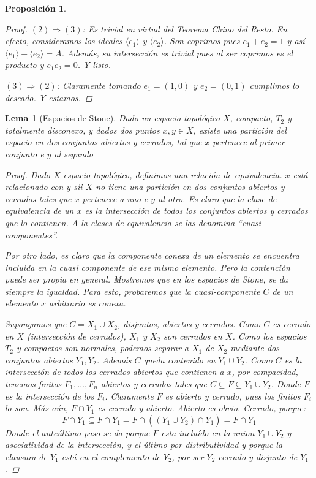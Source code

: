 \documentclass[11pt,a4paper, spanish,oneside,fleqn]{article}
\newtheorem{lem}[teo]{Lema}
\newtheorem{prop}[teo]{Proposición}
\theoremstyle{definition}
\begin{document}
\begin{prop}
\begin{proof}
$(2)\Longrightarrow (3)$: Es trivial en virtud del Teorema Chino del Resto. En efecto, consideramos los ideales $\langle e_1\rangle$ y $\langle e_2\rangle$. Son coprimos pues $e_1 + e_2=1$ y así $\langle e_1\rangle + \langle e_2\rangle = A$. Además, su intersección es trivial pues al ser coprimos es el producto y $e_1e_2=0$. Y listo.

$(3)\Longrightarrow (2)$: Claramente tomando $e_1= (1,0)$ y $e_2=(0,1)$ cumplimos lo deseado. Y estamos.
\end{proof}
\end{prop}


\begin{lem}[Espacios de Stone]
Dado un espacio topol\'ogico $X$, compacto, $T_2$ y totalmente disconexo, y dados
dos puntos $x,y \in X$, existe una partici\'on del espacio en dos
conjuntos abiertos y cerrados, tal que $x$ pertenece al primer conjunto
e $y$ al segundo
\begin{proof}
Dado $X$ espacio topol\'ogico, definimos una relaci\'on de equivalencia. $x$ est\'a
relacionado con $y$ sii $X$ no tiene una partici\'on en dos conjuntos abiertos y
cerrados tales que $x$ pertenece a uno e $y$ al otro. Es claro que la clase de
equivalencia de un $x$ es la intersecci\'on de todos los conjuntos abiertos y
cerrados que lo contienen. A la clases de equivalencia se las denomina ``cuasi-componentes''.

Por otro lado, es claro que la componente conexa de un elemento se encuentra incluida
en la cuasi componente de ese mismo elemento. Pero la contenci\'on puede ser propia
en general. Mostremos que en los espacios de Stone, se da siempre la igualdad.
Para esto, probaremos que la cuasi-componente $C$ de un elemento $x$ arbitrario es conexa.

Supongamos que $C = X_1 \cup X_2$, disjuntos, abiertos y cerrados.
Como $C$ es cerrado en $X$ (intersecci\'on de cerrados), $X_1$ y $X_2$ son cerrados
en $X$.
Como los espacios $T_2$ y compactos son normales, podemos separar a $X_1$ de $X_2$
mediante dos conjuntos abiertos $Y_1,Y_2$. Adem\'as $C$ queda contenido en $Y_1 \cup Y_2$.
Como $C$ es la intersecci\'on de todos los cerrados-abiertos que contienen a $x$, por compacidad,
tenemos finitos $F_1,\ldots,F_n$ abiertos y cerrados tales que
$C\subseteq F \subseteq Y_1 \cup Y_2$. Donde $F$ es la intersecci\'on de los $F_i$.
Claramente $F$ es abierto y cerrado, pues los finitos $F_i$ lo son.
M\'as a\'un, $F\cap Y_1$ es cerrado y abierto. Abierto es obvio.
Cerrado, porque:
$$\overline{F\cap Y_1} \subseteq F \cap \overline{Y_1} = F \cap ((Y_1 \cup Y_2) \cap \overline{Y_1}) = F \cap Y_1$$
Donde el ante\'ultimo paso se da porque $F$ esta inclu\'ido en la union $Y_1 \cup Y_2$ y asociatividad
de la intersecci\'on,
y el \'ultimo por distributividad y porque la clausura de $Y_1$ est\'a en el complemento de $Y_2$,
por ser $Y_2$ cerrado y disjunto de $Y_1$.


\end{proof}
\end{lem}
\end{document}

